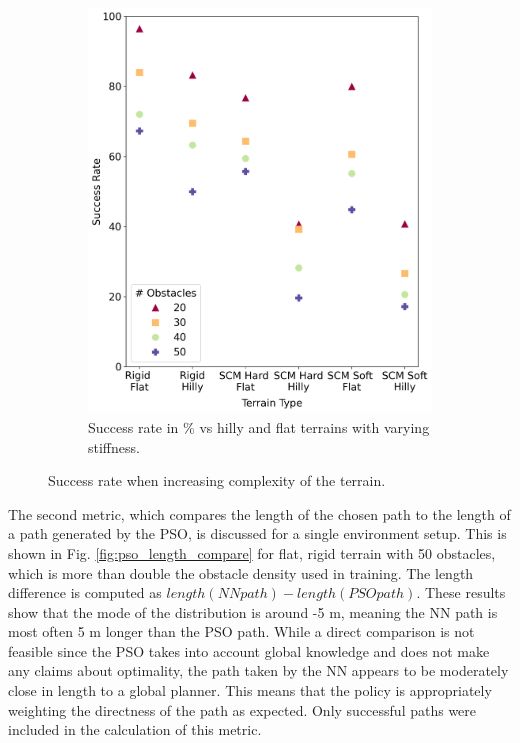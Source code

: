 \begin{figure}
\begin{subfigure}{0.44\textwidth}
        \includegraphics[height=.25\paperheight]{images/demonstration/terrain_obstacles_flat_and_height_success_rate.png}
        \caption{Success rate in \% vs hilly and flat terrains with varying stiffness.}
        \label{fig:obstacles_hilly_and_flat_success}
    \end{subfigure}
    \caption{Success rate when increasing complexity of the terrain.}
    \label{fig:successRates}
\end{figure}

The second metric, which compares the length of the chosen path to the length of a path generated by the PSO, is discussed for a single environment setup. This is shown in Fig. \ref{fig:pso_length_compare} for flat, rigid terrain with 50 obstacles, which is more than double the obstacle density used in training. The length difference is computed as $length(NN path) - length(PSO path)$. These results show that the mode of the distribution is around -5 m, meaning the NN path is most often 5 m longer than the PSO path. While a direct comparison is not feasible since the PSO takes into account global knowledge and does not make any claims about optimality, the path taken by the NN appears to be moderately close in length to a global planner. This means that the policy is appropriately weighting the directness of the path as expected. Only successful paths were included in the calculation of this metric.

